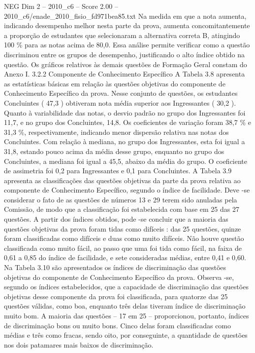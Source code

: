 \begin{textsample}{NEG Dim 2 – 2010\_c6 – Score 2.00 – 2010\_c6/enade\_2010\_fisio\_fd971bea85.txt}
Na medida em que a nota aumenta, indicando desempenho melhor nesta parte da prova, aumenta concomitantemente a proporção de estudantes que selecionaram a alternativa correta B, atingindo 100 \% para as notas acima de 80,0.
Essa análise permite verificar como a questão discriminou entre os grupos de desempenho, justificando o alto índice obtido na questão.
Os gráficos relativos às demais questões de Formação Geral constam do Anexo I. 3.2.2 Componente de Conhecimento Específico A Tabela 3.8 apresenta as estatísticas básicas em relação às questões objetivas do componente de Conhecimento Específico da prova.
Nesse conjunto de questões, os estudantes Concluintes ( 47,3 ) obtiveram nota média superior aos Ingressantes ( 30,2 ).
Quanto à variabilidade das notas, o desvio padrão no grupo dos Ingressantes foi 11,7, e no grupo dos Concluintes, 14,8.
Os coeficientes de variação foram 38,7 \% e 31,3 \%, respectivamente, indicando menor dispersão relativa nas notas dos Concluintes.
Com relação à mediana, no grupo dos Ingressantes, esta foi igual a 31,8, estando pouco acima da média desse grupo, enquanto no grupo dos Concluintes, a mediana foi igual a 45,5, abaixo da média do grupo.
O coeficiente de assimetria foi 0,2 para Ingressantes e 0,1 para Concluintes.
A Tabela 3.9 apresenta as classificações das questões objetivas da parte da prova relativa ao componente de Conhecimento Específico, segundo o índice de facilidade.
Deve -se considerar o fato de as questões de números 13 e 29 terem sido anuladas pela Comissão, de modo que a classificação foi estabelecida com base em 25 das 27 questões.
A partir dos índices obtidos, pode -se concluir que a maioria das questões objetivas da prova foram tidas como difíceis : das 25 questões, quinze foram classificadas como difíceis e duas como muito difíceis.
Não houve questão classificada como muito fácil, ao passo que uma foi tida como fácil, na faixa de 0,61 a 0,85 do índice de facilidade, e sete consideradas médias, entre 0,41 e 0,60.
Na Tabela 3.10 são apresentados os índices de discriminação das questões objetivas do componente de Conhecimento Específico da prova.
Observa -se, segundo os índices estabelecidos, que a capacidade de discriminação das questões objetivas desse componente da prova foi classificada, para quatorze das 25 questões válidas, como boa, enquanto três delas tiveram índice de discriminação muito bom.
A maioria das questões – 17 em 25 – proporcionou, portanto, índices de discriminação bons ou muito bons.
Cinco delas foram classificadas como médias e três como fracas, sendo oito, por conseguinte, a quantidade de questões nos dois patamares mais baixos de discriminação.

\end{textsample}
